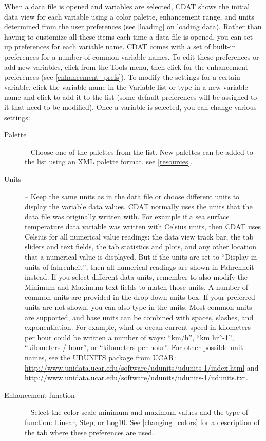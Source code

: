 When a data file is opened and variables are selected, CDAT shows
the initial data view for each variable using a color palette,
enhancement range, and units determined from the user preferences
(see \autoref{loading} on loading data).  Rather than having to
customize all these items each time a data file is opened, you
can set up preferences for each variable name.  CDAT comes with a
set of built-in preferences for a number of common variable
names.  To edit these preferences or add new variables, click
 from the {\gui Tools} menu, then
click  for the enhancement
preferences (see \autoref{enhancement_prefs}).  To modify the
settings for a certain variable, click the variable name in the
{\gui Variable} list or type in a new variable name and click
 to add it to the list (some default preferences
will be assigned to it that need to be modified).  Once a
variable is selected, you can change various settings:
\begin{description}

\item[Palette] -- Choose one of the palettes from the list.  New
palettes can be added to the list using an XML palette format,
see \autoref{resources}.

\item[Units] -- Keep the same units as in the data file or choose
different units to display the variable data values.  CDAT
normally uses the units that the data file was originally written
with.  For example if a sea surface temperature data variable was
written with Celsius units, then CDAT uses Celsius for all
numerical value readings: the data view track bar, the
 tab sliders and text
fields, the  tab statistics
and plots, and any other location that a numerical value is
displayed.  But if the units are set to ``Display in units of
fahrenheit'', then all numerical readings are shown in Fahrenheit
instead.  If you select different data units, remember to also
modify the {\gui Minimum} and {\gui Maximum} text fields to match
those units.  A number of common units are provided in the
drop-down units box. If your preferred units are not shown, you
can also type in the units. Most common units are supported, and
base units can be combined with spaces, slashes, and
exponentiation. For example, wind or ocean current speed in
kilometers per hour could be written a number of ways: ``km/h'',
``km hr\^{~}-1'', ``kilometers / hour'', or ``kilometers per
hour''.  For other possible unit names, see the UDUNITS package
from UCAR:
\url{http://www.unidata.ucar.edu/software/udunits/udunits-1/index.html}
and
\url{http://www.unidata.ucar.edu/software/udunits/udunits-1/udunits.txt}.

\item[Enhancement function] -- Select the color scale minimum and
maximum values and the type of function: {\gui Linear},
{\gui Step}, or {\gui Log10}. See \autoref{changing_colors} for a
description of the  tab
where these preferences are used.

\end{description}
